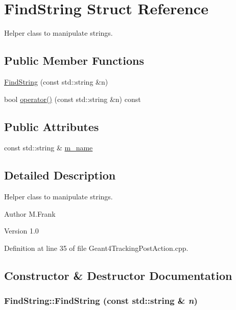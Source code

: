 \hypertarget{struct_find_string}{
\section{FindString Struct Reference}
\label{struct_find_string}
}


Helper class to manipulate strings.  
\subsection*{Public Member Functions}
\begin{DoxyCompactItemize}
\item 
\hyperlink{struct_find_string_a355f278ab247210e03e1200077c276ec}{FindString} (const std::string \&n)
\item 
bool \hyperlink{struct_find_string_a3cd8eb0bfd5c953d9df1db4344330237}{operator()} (const std::string \&n) const 
\end{DoxyCompactItemize}
\subsection*{Public Attributes}
\begin{DoxyCompactItemize}
\item 
const std::string \& \hyperlink{struct_find_string_a7acb1627655d24666e9107df3b60441a}{m\_\-name}
\end{DoxyCompactItemize}


\subsection{Detailed Description}
Helper class to manipulate strings. \begin{DoxyAuthor}{Author}
M.Frank 
\end{DoxyAuthor}
\begin{DoxyVersion}{Version}
1.0 
\end{DoxyVersion}


Definition at line 35 of file Geant4TrackingPostAction.cpp.

\subsection{Constructor \& Destructor Documentation}
\hypertarget{struct_find_string_a355f278ab247210e03e1200077c276ec}{
\subsubsection[{FindString}]{\setlength{\rightskip}{0pt plus 5cm}FindString::FindString (const std::string \& {\em n})}}
\label{struct_find_string_a355f278ab247210e03e1200077c276ec}


